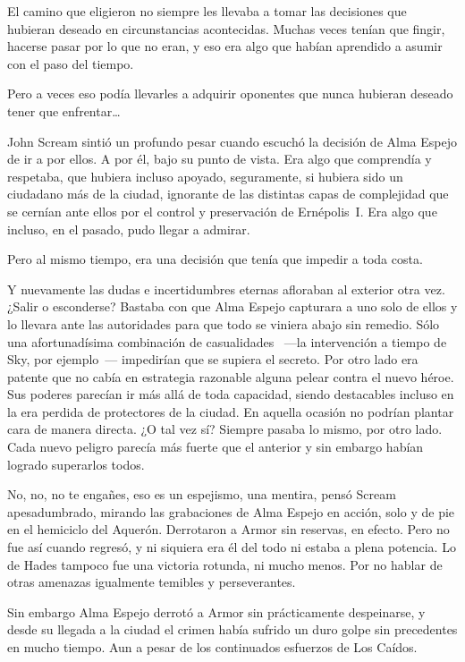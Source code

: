El camino que eligieron no siempre les llevaba a tomar las decisiones que hubieran deseado en circunstancias acontecidas. Muchas veces tenían que fingir, hacerse pasar por lo que no eran, y eso era algo que habían aprendido a asumir con el paso del tiempo.

Pero a veces eso podía llevarles a adquirir oponentes que nunca hubieran deseado tener que enfrentar\dots

\fancyparbreak
John Scream sintió un profundo pesar cuando escuchó la decisión de Alma Espejo de ir a por ellos. A por él, bajo su punto de vista. Era algo que comprendía y respetaba, que hubiera incluso apoyado, seguramente, si hubiera sido un ciudadano más de la ciudad, ignorante de las distintas capas de complejidad que se cernían ante ellos por el control y preservación de Ernépolis~I. Era algo que incluso, en el pasado, pudo llegar a admirar.

Pero al mismo tiempo, era una decisión que tenía que impedir a toda costa.

Y nuevamente las dudas e incertidumbres eternas afloraban al exterior otra vez. ¿Salir o esconderse? Bastaba con que Alma Espejo capturara a uno solo de ellos y lo llevara ante las autoridades para que todo se viniera abajo sin remedio. Sólo una afortunadísima combinación de casualidades ~---la intervención a tiempo de Sky, por ejemplo~--- impedirían que se supiera el secreto. Por otro lado era patente que no cabía en estrategia razonable alguna pelear contra el nuevo héroe. Sus poderes parecían ir más allá de toda capacidad, siendo destacables incluso en la era perdida de protectores de la ciudad. En aquella ocasión no podrían plantar cara de manera directa. ¿O tal vez sí? Siempre pasaba lo mismo, por otro lado. Cada nuevo peligro parecía más fuerte que el anterior y sin embargo habían logrado superarlos todos.

No, no, no te engañes, eso es un espejismo, una mentira, pensó Scream apesadumbrado, mirando las grabaciones de Alma Espejo en acción, solo y de pie en el hemiciclo del Aquerón. Derrotaron a Armor sin reservas, en efecto. Pero no fue así cuando regresó, y ni siquiera era él del todo ni estaba a plena potencia. Lo de Hades tampoco fue una victoria rotunda, ni mucho menos. Por no hablar de otras amenazas igualmente temibles y perseverantes.

Sin embargo Alma Espejo derrotó a Armor sin prácticamente despeinarse, y desde su llegada a la ciudad el crimen había sufrido un duro golpe sin precedentes en mucho tiempo. Aun a pesar de los continuados esfuerzos de Los Caídos.


